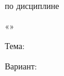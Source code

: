 \begin{titlepage}
\vspace*{-14mm}
\begingroup
\centering

\normalsize
\ProjectUniversity\par

\vspace{6pt}
\ProjectDepartment\par

\vfill

{\Large\bfseries \ProjectRenderedWorkType\par}

\vspace{8pt}
по дисциплине\par

\vspace{4pt}
«\ProjectSubject»\par

\vspace{12pt}
\if\relax\detokenize\expandafter{\ProjectTheme}\relax
\else
Тема:\par
\vspace{4pt}
\AmpRenderProjectTheme
\fi
\if\relax\detokenize\expandafter{\ProjectVariant}\relax
\else
\vspace{6pt}
Вариант: \ProjectVariant\par
\fi

\vfill

\endgroup


\end{titlepage}
